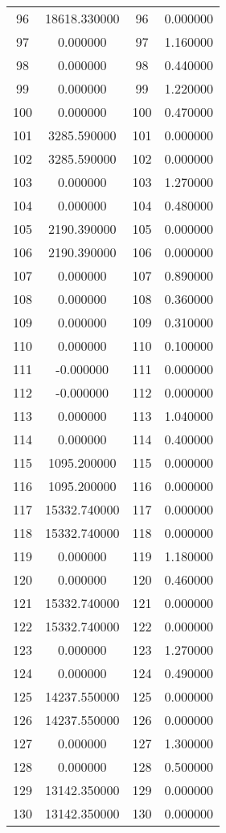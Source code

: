\documentclass[12pt]{article}
\begin{document}
\begin{longtable}{@{}cccc@{}}
96 & 18618.330000 & 96 & 0.000000 \\
97 & 0.000000 & 97 & 1.160000 \\
98 & 0.000000 & 98 & 0.440000 \\
99 & 0.000000 & 99 & 1.220000 \\
100 & 0.000000 & 100 & 0.470000 \\
101 & 3285.590000 & 101 & 0.000000 \\
102 & 3285.590000 & 102 & 0.000000 \\
103 & 0.000000 & 103 & 1.270000 \\
104 & 0.000000 & 104 & 0.480000 \\
105 & 2190.390000 & 105 & 0.000000 \\
106 & 2190.390000 & 106 & 0.000000 \\
107 & 0.000000 & 107 & 0.890000 \\
108 & 0.000000 & 108 & 0.360000 \\
109 & 0.000000 & 109 & 0.310000 \\
110 & 0.000000 & 110 & 0.100000 \\
111 & -0.000000 & 111 & 0.000000 \\
112 & -0.000000 & 112 & 0.000000 \\
113 & 0.000000 & 113 & 1.040000 \\
114 & 0.000000 & 114 & 0.400000 \\
115 & 1095.200000 & 115 & 0.000000 \\
116 & 1095.200000 & 116 & 0.000000 \\
117 & 15332.740000 & 117 & 0.000000 \\
118 & 15332.740000 & 118 & 0.000000 \\
119 & 0.000000 & 119 & 1.180000 \\
120 & 0.000000 & 120 & 0.460000 \\
121 & 15332.740000 & 121 & 0.000000 \\
122 & 15332.740000 & 122 & 0.000000 \\
123 & 0.000000 & 123 & 1.270000 \\
124 & 0.000000 & 124 & 0.490000 \\
125 & 14237.550000 & 125 & 0.000000 \\
126 & 14237.550000 & 126 & 0.000000 \\
127 & 0.000000 & 127 & 1.300000 \\
128 & 0.000000 & 128 & 0.500000 \\
129 & 13142.350000 & 129 & 0.000000 \\
130 & 13142.350000 & 130 & 0.000000 \\

\end{longtable}
\end{document}

